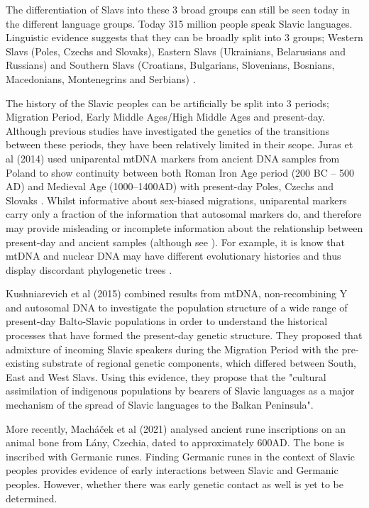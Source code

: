 The differentiation of Slavs into these 3 broad groups can still be seen today in the different language groups. Today 315 million people speak Slavic languages. Linguistic evidence suggests that they can be broadly split into 3 groups; Western Slavs (Poles, Czechs and Slovaks), Eastern Slavs (Ukrainians, Belarusians and Russians) and Southern Slavs (Croatians, Bulgarians, Slovenians, Bosnians, Macedonians, Montenegrins and Serbians) \cite{sussex2006slavic}. 

The history of the Slavic peoples can be artificially be split into 3 periods; Migration Period, Early Middle Ages/High Middle Ages and present-day. Although previous studies have investigated the genetics of the transitions between these periods, they have been relatively limited in their scope. Juras et al (2014) used uniparental mtDNA markers from ancient DNA samples from Poland to show continuity between both Roman Iron Age period (200 BC – 500 AD) and Medieval Age (1000–1400AD) with present-day Poles, Czechs and Slovaks \cite{Juras2014}. Whilst informative about sex-biased migrations, uniparental markers carry only a fraction of the information that autosomal markers do, and therefore may provide misleading or incomplete information about the relationship between present-day and ancient samples \cite{Shaw16122} (although see \cite{10.1080/10635150500234674}). For example, it is know that mtDNA and nuclear DNA may have different evolutionary histories and thus display discordant phylogenetic trees \cite{posth2017deeply}. 

Kushniarevich et al (2015) \cite{Kushniarevich23015} combined results from mtDNA, non-recombining Y and autosomal DNA to investigate the population structure of a wide range of present-day Balto-Slavic populations in order to understand the historical processes that have formed the present-day genetic structure. They proposed that admixture of incoming Slavic speakers during the Migration Period with the pre-existing substrate of regional genetic components, which differed between South, East and West Slavs. Using this evidence, they propose that the "cultural assimilation of indigenous populations by bearers of Slavic languages as a major mechanism of the spread of Slavic languages to the Balkan Peninsula".

More recently, Macháček et al (2021) \cite{MACHACEK2021105333} analysed ancient rune inscriptions on an animal bone from Lány, Czechia, dated to approximately 600AD. The bone is inscribed with Germanic runes. Finding Germanic runes in the context of Slavic peoples provides evidence of early interactions between Slavic and Germanic peoples. However, whether there was early genetic contact as well is yet to be determined. 

